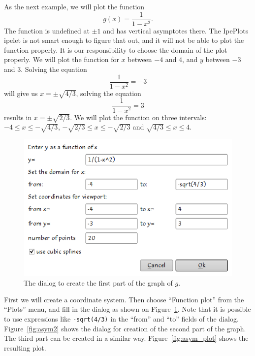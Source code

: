 \documentclass{article}
\begin{document}
As the next example, we will plot the function 
\[g(x) = \frac{1}{1-x^2}.\]
The function is undefined at $\pm 1$ and has vertical asymptotes there. The
IpePlots ipelet is not smart enough to figure that out, and it will not be able
to plot the function properly.  It is our responsibility to choose the domain
of the plot properly.  We will plot the function for $x$ between $-4$ and $4$,
and $y$ between $-3$ and $3$.  Solving the equation 
\[\frac{1}{1-x^2} = -3\]
will give us $x = \pm \sqrt{4/3}$, solving the equation 
\[\frac{1}{1-x^2} = 3\]
results in $x = \pm \sqrt{2/3}$. 
We will plot the function on three intervals: $-4\le x \le -\sqrt{4/3}$,
$-\sqrt{2/3} \le x \le -\sqrt{2/3}$ and $\sqrt{4/3} \le x \le 4$. 
\begin{figure}[h]
   \begin{center}
      \includegraphics[scale=.5]{asym1.png}
   \end{center}
   \caption{The dialog to create the first part of the graph of $g$.}
   \label{fig:asym1}
\end{figure}

First we will create a coordinate system.  Then choose ``Function plot'' from
the ``Plots'' menu, and fill in the dialog as shown on Figure~\ref{fig:asym1}.
Note that it is possible to use expressions like \texttt{-sqrt(4/3)} in the
``from'' and ``to'' fields of the dialog.  Figure~\ref{fig:asym2} shows the
dialog for creation of the second part of the graph.  The third part can be
created in a similar way. Figure~\ref{fig:asym_plot} shows the resulting plot.
\end{document}
